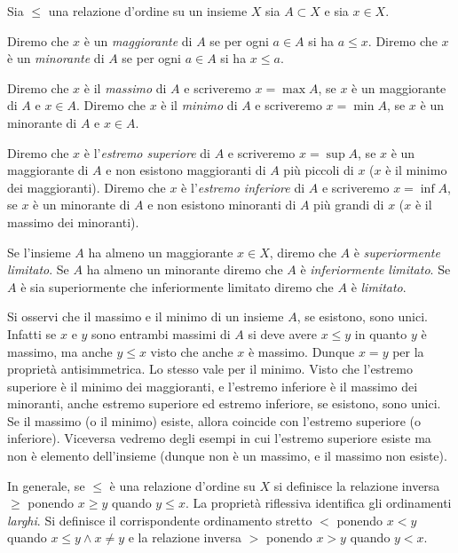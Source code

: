 \begin{definition}
  \label{def:massimo}%
  \label{def:minimo}%
  \label{def:maggiorante}%
  \label{def:minorante}%
  \label{def:sup}%
  \label{def:inf}%
  Sia $\le$ una relazione d'ordine su un insieme $X$
  sia $A\subset X$ e sia $x\in X$.

  Diremo che $x$ è un \emph{maggiorante} di $A$ se per ogni $a\in A$
  si ha $a\le x$.
  Diremo che $x$ è un \emph{minorante} di $A$ se per ogni $a\in A$
  si ha $x\le a$.
  
  Diremo che $x$ è il \emph{massimo} di $A$ 
  e scriveremo $x=\max A$,
  se $x$ è un maggiorante di $A$ e $x\in A$.
  Diremo che $x$ è il \emph{minimo} di $A$ 
  e scriveremo $x=\min A$,
  se $x$ è un minorante di $A$ e $x\in A$.
  
  Diremo che $x$ è l'\emph{estremo superiore} di $A$ 
  e scriveremo $x=\sup A$,
  se $x$ è un maggiorante di $A$
  e non esistono maggioranti di $A$ più piccoli di $x$
  ($x$ è il minimo dei maggioranti).
  Diremo che $x$ è l'\emph{estremo inferiore} di $A$ 
  e scriveremo $x=\inf A$,
  se $x$ è un minorante di $A$
  e non esistono minoranti di $A$ più grandi di $x$
  ($x$ è il massimo dei minoranti).

  Se l'insieme $A$ ha almeno un maggiorante $x\in X$, diremo che $A$ 
  è \emph{superiormente limitato}. 
  Se $A$ ha almeno un minorante diremo che $A$ è \emph{inferiormente limitato}.
  Se $A$ è sia superiormente che inferiormente limitato diremo che $A$ è \emph{limitato}.
\end{definition}

Si osservi che il massimo e il minimo di un insieme $A$, se esistono, 
sono unici. Infatti se $x$ e $y$ sono entrambi massimi di $A$
si deve avere $x\le y$ in quanto $y$ è massimo, ma anche $y\le x$ 
visto che anche $x$ è massimo. 
Dunque $x=y$ per la proprietà antisimmetrica. 
Lo stesso vale per il minimo.
Visto che l'estremo superiore è il minimo dei maggioranti, e l'estremo inferiore 
è il massimo dei minoranti, anche estremo superiore ed estremo inferiore,
se esistono, sono unici.
Se il massimo (o il minimo) esiste, allora coincide con 
l'estremo superiore (o inferiore). 
Viceversa vedremo degli esempi in cui l'estremo superiore esiste ma non 
è elemento dell'insieme (dunque non è un massimo, e il massimo non esiste).

In generale, se $\le$ è una relazione d'ordine su $X$ si definisce la 
relazione inversa $\ge$ ponendo $x\ge y$ quando $y\le x$.
La proprietà riflessiva identifica gli ordinamenti \emph{larghi}.
Si definisce il corrispondente ordinamento stretto $<$
ponendo $x < y$ quando $x\le y \land x\neq y$
e la relazione inversa $>$ ponendo $x>y$ quando $y<x$.

